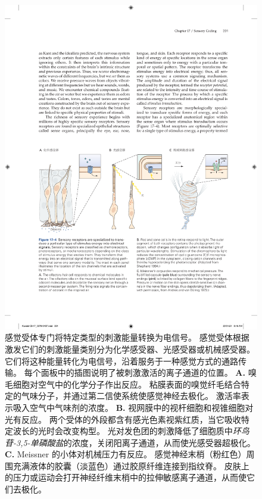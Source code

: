 \begin{figure}[htbp]
	\centering
	\includegraphics[width=1.0\linewidth]{chap17/fig_17_4}
	\caption{感觉受体专门将特定类型的刺激能量转换为电信号。 
		感觉受体根据激发它们的刺激能量类别分为化学感受器、光感受器或机械感受器。
		它们将这种能量转化为电信号，沿着服务于一种感觉方式的通路传输。
		每个面板中的插图说明了被刺激激活的离子通道的位置。
		\textbf{A.} 嗅毛细胞对空气中的化学分子作出反应。
		粘膜表面的嗅觉纤毛结合特定的气味分子，并通过第二信使系统使感觉神经去极化。
		激活率表示吸入空气中气味剂的浓度。
		\textbf{B.} 视网膜中的视杆细胞和视锥细胞对光有反应。
		两个受体的外段都含有感光色素视紫红质，当它吸收特定波长的光时会改变构型。
		光对发色团的刺激降低了细胞质中\textit{环鸟苷-3,5-单磷酸盐}的浓度，关闭阳离子通道，从而使光感受器超极化\cite{shepherd1988neurobiology}。
		\textbf{C.} Meissner 的小体对机械压力有反应。 
		感觉神经末梢（粉红色）周围充满液体的胶囊（淡蓝色）通过胶原纤维连接到指纹脊。
		皮肤上的压力或运动会打开神经纤维末梢中的拉伸敏感离子通道，从而使它们去极化\cite{albe1973morphology}。}
	\label{fig:17_4}
\end{figure}


